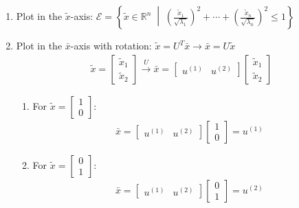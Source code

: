 \begin{process}
    \begin{enumerate}
        \item Plot in the $\tilde{x}$-axis: $\mathcal{E} = \left\{ \tilde{x} \in \mathbb{R}^n \; \middle| \; \left( \frac{\tilde{x}_1}{\sqrt{\lambda_1}} \right)^2 + \cdots + \left( \frac{\tilde{x}_n}{\sqrt{\lambda_n}} \right)^2 \leq 1 \right\}$

        \item Plot in the $\bar{x}$-axis with rotation: $\tilde{x} = U^T \bar{x}  \rightarrow \bar{x} = U \tilde{x}$
        \begin{align*}
            \tilde{x} = \begin{bmatrix} \tilde{x}_1 \\ \tilde{x}_2 \end{bmatrix} \xrightarrow[]{U} \bar{x} = \begin{bmatrix} u^{(1)} & u^{(2)} \end{bmatrix} \begin{bmatrix} \tilde{x}_1 \\ \tilde{x}_2 \end{bmatrix}
        \end{align*}

        \begin{enumerate}
            \item For $\tilde{x} = \begin{bmatrix} 1 \\ 0 \end{bmatrix}$: 
            \begin{align*}
                \bar{x} = \begin{bmatrix} u^{(1)} & u^{(2)} \end{bmatrix} \begin{bmatrix} 1 \\ 0 \end{bmatrix} = u^{(1)}
            \end{align*}
            \item For $\tilde{x} = \begin{bmatrix} 0 \\ 1 \end{bmatrix}$: 
            \begin{align*}
                \bar{x} = \begin{bmatrix} u^{(1)} & u^{(2)} \end{bmatrix} \begin{bmatrix} 0 \\ 1 \end{bmatrix} = u^{(2)}
            \end{align*}
        \end{enumerate}


\end{enumerate}
\end{process}
